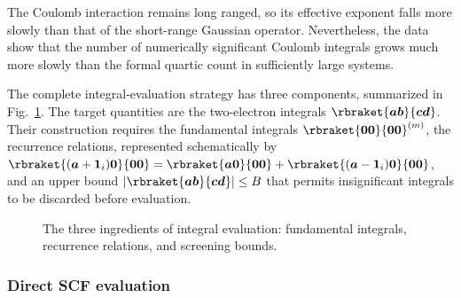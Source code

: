 The Coulomb interaction remains long ranged, so its effective exponent falls
more slowly than that of the short-range Gaussian operator. Nevertheless, the
data show that the number of numerically significant Coulomb integrals grows
much more slowly than the formal quartic count in sufficiently large systems.

The complete integral-evaluation strategy has three components, summarized in
Fig.~\ref{fig:integral-recipe}. The target
quantities are the two-electron integrals
$\rbraket{\ba\bb}{\bc\bd}$. Their construction requires the fundamental
integrals $\rbraket{\bO\bO}{\bO\bO}^{(m)}$, the recurrence relations,
represented schematically by
$\rbraket{(\ba+\bI_i)\bO}{\bO\bO}
=\rbraket{\ba\bO}{\bO\bO}
+\rbraket{(\ba-\bI_i)\bO}{\bO\bO}$, and an upper bound
$\abs{\rbraket{\ba\bb}{\bc\bd}}\leq B$ that permits insignificant
integrals to be discarded before evaluation.

\begin{figure}[htbp]
 \centering
 \caption{The three ingredients of integral evaluation: fundamental
 integrals, recurrence relations, and screening bounds.}
 \label{fig:integral-recipe}
\end{figure}

\subsubsection{Direct SCF evaluation}

